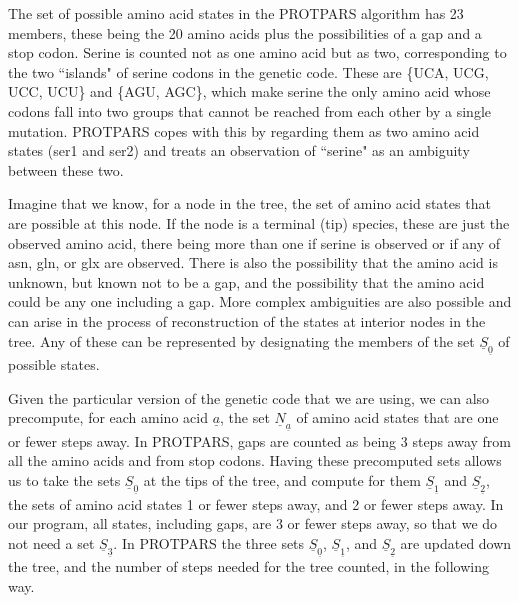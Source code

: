 \documentclass[12pt]{article}
\def\ul{\underline}
\begin{document}
The set of possible amino acid states in the PROTPARS algorithm has 23 members,
these being the 20 amino acids plus the possibilities of a gap and a stop codon.
Serine is counted not as one amino acid but as two, corresponding to the
two ``islands" of serine codons in the genetic code.  These are
\{UCA, UCG, UCC, UCU\} and \{AGU, AGC\}, which make serine the only amino acid
whose codons fall into two groups that cannot be reached from each other by
a single mutation.  PROTPARS copes with this by regarding them as two amino acid
states (ser1 and ser2) and treats an observation of ``serine" as an ambiguity between
these two.

Imagine that we know, for a node in the tree, the set of amino acid states
that are possible at this node.  If the node is a terminal (tip) species,
these are just the observed amino acid, there being more than one if serine
is observed or if any of asn, gln, or glx are observed.  There is also the
possibility that the amino acid is unknown, but known not to be a gap, and
the possibility that the amino acid could be any one including a gap.  More
complex ambiguities are also possible and can arise in the process of reconstruction
of the states at interior nodes in the tree.  Any of these can be represented
by designating the members of the set $\ul{S}_{\ul{0}}$ of possible states.

Given the particular version of the genetic code that we are using, we can
also precompute, for each amino acid $\ul{a}$, the set $\ul{N}_{\ul{a}}$ of amino acid states that are one or
fewer steps away.  In PROTPARS, gaps are counted as being 3 steps away from
all the amino acids and from stop codons.  Having these precomputed sets allows
us to take the sets
$\ul{S}_{\ul{0}}$ at the tips of the tree, and compute for them $\ul{S}_{\ul{1}}$ and $\ul{S}_{\ul{2}}$, the sets
of amino acid states 1 or fewer steps away, and 2 or fewer steps away.  In
our program, all states, including gaps, are 3 or fewer steps away, so that
we do not need a set $\ul{S}_{\ul{3}}$.  In PROTPARS
the three sets $\ul{S}_{\ul{0}}$, $\ul{S}_{\ul{1}}$, and $\ul{S}_{\ul{2}}$ are updated down the tree, and the
number of steps needed for the tree counted, in the following way.
\end{document}
